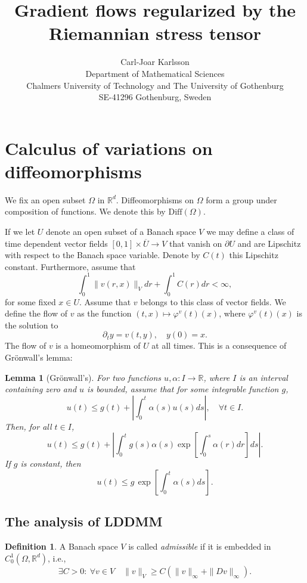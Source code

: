 \documentclass[a5paper,11pt,twoside]{article}
\title{Gradient flows regularized by the Riemannian stress tensor}
\author{Carl-Joar Karlsson  \\ 
	\small Department of Mathematical Sciences \\
	\small Chalmers University of Technology and The University of Gothenburg\\
	\small SE-41296 Gothenburg, Sweden}
\theoremstyle{plain}
\newtheorem{lem}[teo]{Lemma}
\newcommand{\R}{\ensuremath{\mathbb{R}}}
\newcommand{\Diff}{\ensuremath{\mathrm{Diff}}}
\theoremstyle{definition}
\newtheorem{defin}[teo]{Definition}
\begin{document}
\maketitle
\thispagestyle{empty}
\setcounter{page}{0}

\section[Calculus of variations]{Calculus of variations on diffeomorphisms}
We fix an open subset $\Omega$ in $\R^d$. Diffeomorphisms on $\Omega$ form a group under composition of functions. We denote this by $\Diff(\Omega)$.

If we let $U$ denote an open subset of a Banach space $V$ we may define a class of time dependent vector fields $[0,1]\times \overline{U}\to V$ that vanish on $\partial U$ and are Lipschitz with respect to the Banach space variable. Denote by $C(t)$ this Lipschitz constant. Furthermore, assume that
\[
\int_0^1\|v(r,x)\|_Vdr+\int_0^1 C(r)dr<\infty,
\]
for some fixed $x\in U$. Assume that $v$ belongs to this class of vector fields. We define the flow of $v$ as the function $(t,x)\mapsto\varphi^v(t)(x)$, where $\varphi^v(t)(x)$ is the solution to 
\[ \partial_t y=v(t,y),\quad y(0)=x. \]
The flow of $v$ is a homeomorphism of $U$ at all times. This is a consequence of Grönwall's lemma:

\begin{lem}[Grönwall's]
\label{gronwalls}
For two functions $u,\alpha:I\to \R$, where $I$ is an interval containing zero and $u$ is bounded, assume that for some integrable function $g$,
\[
u(t)\leq g(t)+\left|\int_0^t\alpha(s)u(s)ds\right|,\quad \forall t\in I.
\]
Then, for all $t\in I$,
\[
u(t)\leq g(t)+\left|\int_0^t g(s)\alpha(s)\exp[\int_0^s\alpha(r)dr]ds\right|.
\]
If $g$ is constant, then
\[
u(t)\leq g\,\exp\left[\int_0^t\alpha(s)ds\right].
\]
\end{lem}



\subsection{The analysis of LDDMM \label{sec:LDDMM}}

\begin{defin}
	A Banach space $V$ is called \textit{admissible} if it is embedded in $C_0^1(\Omega,\R^d)$, i.e., 
	\[
	\exists C>0: \ \forall v\in V\quad \|v\|_V\geq C(\|v\|_\infty+\|Dv\|_\infty).
	\]
\end{defin}
\end{document}
